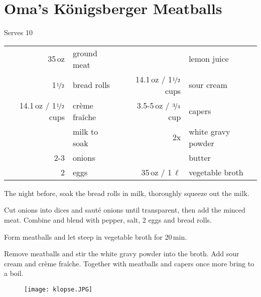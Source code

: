 \section{Oma's K\"{o}nigsberger Meatballs}
\begin{centering}
Serves 10
\begin{table}[H]
\centering
\begin{tabular*}{1\textwidth}{rlrl}
35\,oz & ground meat & & lemon juice \\
1$\nicefrac{1}{2}$ & bread rolls & 14.1\,oz / 1$\nicefrac{1}{2}$ cups & sour cream \\
14.1\,oz / 1$\nicefrac{1}{2}$ cups & cr\`{e}me fra\^{i}che &3.5-5\,oz / $\nicefrac{3}{4}$ cup & capers \\
&milk to soak &2x &white gravy powder\\
2-3 & onions & &butter\\
2 & eggs & 35\,oz / 1\,$\ell$ & vegetable broth\\
\end{tabular*}
\end{table}
\end{centering}
\begin{Notes}
\item The night before, soak the bread rolls in milk, thoroughly squeeze out the milk.
\item Cut onions into dices and saut\'{e} onions until transparent, then add the minced meat. Combine and blend with pepper, salt, 2 eggs and bread rolls. 
\item Form meatballs and let steep in vegetable broth for 20\,min.
\item Remove meatballs and stir the white gravy powder into the broth. Add sour cream and cr\`{e}me fra\^{i}che. Together with meatballs and capers once more bring to a boil.
\end{Notes}
\vfill
\begin{figure}[H]
  \centering
  \texttt{[image: klopse.JPG]}
\end{figure}
\newpage
